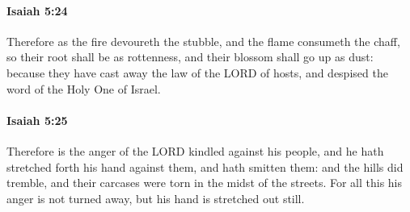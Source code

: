 		\paragraph{Isaiah 5:24} %
			\label{ISAIAH-5-24}

			Therefore as the fire devoureth the stubble, and the flame consumeth the chaff, so their root shall be as rottenness, and their blossom shall go up as dust: because they have cast away the law of the LORD of hosts, and despised the word of the Holy One of Israel.


		\paragraph{Isaiah 5:25} %
			\label{ISAIAH-5-25}

			Therefore is the anger of the LORD kindled against his people, and he hath stretched forth his hand against them, and hath smitten them: and the hills did tremble, and their carcases were torn in the midst of the streets. For all this his anger is not turned away, but his hand is stretched out still.

